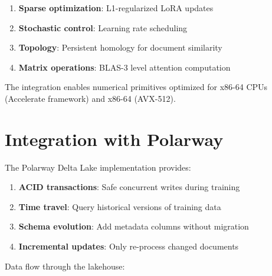 \documentclass[11pt,a4paper]{article}
\theoremstyle{plain}
\theoremstyle{definition}
\begin{document}
\begin{enumerate}
    \item \textbf{Sparse optimization}: L1-regularized LoRA updates
    \item \textbf{Stochastic control}: Learning rate scheduling
    \item \textbf{Topology}: Persistent homology for document similarity
    \item \textbf{Matrix operations}: BLAS-3 level attention computation
\end{enumerate}

The integration enables numerical primitives optimized for x86-64 CPUs
(Accelerate framework) and x86-64 (AVX-512).

\section{Integration with Polarway}
\label{sec:polarway}

The Polarway Delta Lake implementation provides:

\begin{enumerate}
    \item \textbf{ACID transactions}: Safe concurrent writes during training
    \item \textbf{Time travel}: Query historical versions of training data
    \item \textbf{Schema evolution}: Add metadata columns without migration
    \item \textbf{Incremental updates}: Only re-process changed documents
\end{enumerate}

Data flow through the lakehouse:

\begin{center}
\end{center}
\end{document}
